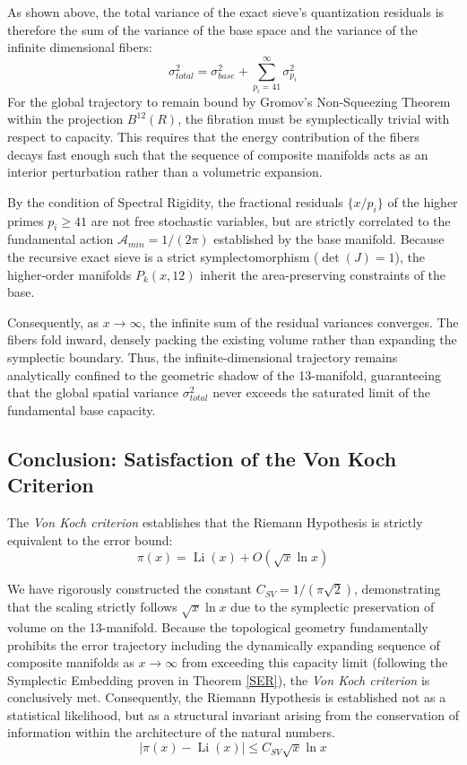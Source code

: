 \documentclass[sn-mathphys-num, pdflatex, referee]{sn-jnl}
\begin{document}
As shown above, the total variance of the exact sieve's quantization residuals is therefore the sum of the variance of the base space and the variance of the infinite dimensional fibers:
\begin{equation}
\sigma_{total}^2 = \sigma_{base}^2 + \sum_{p_i = 41}^{\infty} \sigma_{p_i}^2
\end{equation}
For the global trajectory to remain bound by Gromov's Non-Squeezing Theorem within the projection $B^{12}(R)$, the fibration must be symplectically trivial with respect to capacity. This requires that the energy contribution of the fibers decays fast enough such that the sequence of composite manifolds acts as an interior perturbation rather than a volumetric expansion.

By the condition of Spectral Rigidity, the fractional residuals $\{x/p_i\}$ of the higher primes $p_i \ge 41$ are not free stochastic variables, but are strictly correlated to the fundamental action $\mathcal{A}_{min} = 1/(2\pi)$ established by the base manifold. Because the recursive exact sieve is a strict symplectomorphism ($\det(J)=1$), the higher-order manifolds $P_k(x,12)$ inherit the area-preserving constraints of the base. 

Consequently, as $x \rightarrow \infty$, the infinite sum of the residual variances converges. The fibers fold inward, densely packing the existing volume rather than expanding the symplectic boundary. Thus, the infinite-dimensional trajectory remains analytically confined to the geometric shadow of the 13-manifold, guaranteeing that the global spatial variance $\sigma_{total}^2$ never exceeds the saturated limit of the fundamental base capacity.

\subsection{Conclusion: Satisfaction of the Von Koch Criterion}
\label{VC}

The \textit{Von Koch criterion} \cite{vonkoch} establishes that the Riemann Hypothesis is strictly equivalent to the error bound:
\begin{equation}
\label{eq:VC}
\pi(x) = \operatorname{Li}(x) + O(\sqrt{x} \ln x)
\end{equation}

We have rigorously constructed the constant $C_{SV} = 1/(\pi\sqrt{2})$, demonstrating that the scaling strictly follows $\sqrt{x} \ln x$ due to the symplectic preservation of volume on the 13-manifold. Because the topological geometry fundamentally prohibits the error trajectory including the dynamically expanding sequence of composite manifolds as $x \to \infty$ from exceeding this capacity limit (following the Symplectic Embedding proven in Theorem \ref{SER}), the \textit{Von Koch criterion} is conclusively met. Consequently, the Riemann Hypothesis is established not as a statistical likelihood, but as a structural invariant arising from the conservation of information within the architecture of the natural numbers.
\begin{equation}
\label{thm:bound}
|\pi(x) - \operatorname{Li}(x)| \le C_{SV} \sqrt{x} \ln x
\end{equation}
\end{document}
